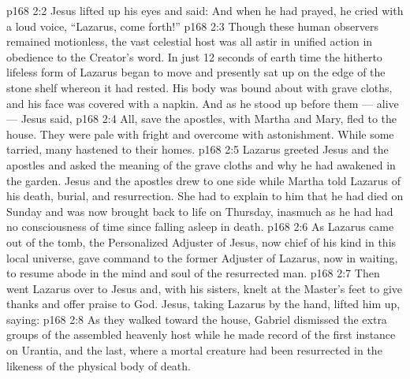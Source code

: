 \vs p168 2:2 Jesus lifted up his eyes and said:  And when he had prayed, he cried with a loud voice, “Lazarus, come forth!”
\vs p168 2:3 Though these human observers remained motionless, the vast celestial host was all astir in unified action in obedience to the Creator’s word. In just 12 seconds of earth time the hitherto lifeless form of Lazarus began to move and presently sat up on the edge of the stone shelf whereon it had rested. His body was bound about with grave cloths, and his face was covered with a napkin. And as he stood up before them --- alive --- Jesus said, 
\vs p168 2:4 All, save the apostles, with Martha and Mary, fled to the house. They were pale with fright and overcome with astonishment. While some tarried, many hastened to their homes.
\vs p168 2:5 Lazarus greeted Jesus and the apostles and asked the meaning of the grave cloths and why he had awakened in the garden. Jesus and the apostles drew to one side while Martha told Lazarus of his death, burial, and resurrection. She had to explain to him that he had died on Sunday and was now brought back to life on Thursday, inasmuch as he had had no consciousness of time since falling asleep in death.
\vs p168 2:6 \pc As Lazarus came out of the tomb, the Personalized Adjuster of Jesus, now chief of his kind in this local universe, gave command to the former Adjuster of Lazarus, now in waiting, to resume abode in the mind and soul of the resurrected man.
\vs p168 2:7 \pc Then went Lazarus over to Jesus and, with his sisters, knelt at the Master’s feet to give thanks and offer praise to God. Jesus, taking Lazarus by the hand, lifted him up, saying: 
\vs p168 2:8 \pc As they walked toward the house, Gabriel dismissed the extra groups of the assembled heavenly host while he made record of the first instance on Urantia, and the last, where a mortal creature had been resurrected in the likeness of the physical body of death.
